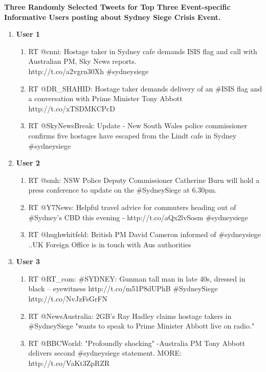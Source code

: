 \textbf{Three Randomly Selected Tweets for Top Three Event-specific Informative Users posting about Sydney Siege Crisis Event.}
\begin{enumerate}
\item \textbf{User 1}
\begin{enumerate}
\item RT @cnni: Hostage taker in Sydney cafe demands ISIS flag and call with Australian PM, Sky News reports. \\ http://t.co/a2vgrn30Xh \#sydneysiege
\item RT @DR\_SHAHID: Hostage taker demands delivery of an \#ISIS flag and a conversation with Prime Minister Tony Abbott http://t.co/xTSDMKCPcD
\item RT @SkyNewsBreak: Update - New South Wales police commissioner confirms five hostages have escaped from the Lindt cafe in Sydney \#sydneysiege
\end{enumerate}

\item \textbf{User 2}
\begin{enumerate}
\item RT @smh: NSW Police Deputy Commissioner Catherine Burn will hold a press conference to update on the \#SydneySiege at 6.30pm.
\item RT @Y7News: Helpful travel advice for commuters heading out of \#Sydney’s CBD this evening - http://t.co/aQx2lvSosm \#sydneysiege
\item RT @hughwhitfeld: British PM David Cameron informed of \#sydneysiege ..UK Foreign Office is in touch with Aus authorities
\end{enumerate}

\item \textbf{User 3}
\begin{enumerate}
\item RT @RT\_com: \#SYDNEY: Gunman tall man in late 40s, dressed in black – eyewitness http://t.co/m51P8dUPhB \#SydneySiege http://t.co/NvJzFsGrFN
\item RT @NewsAustralia: 2GB's Ray Hadley claims hostage takers in \#SydneySiege "wants to speak to Prime Minister Abbott live on radio."
\item RT @BBCWorld: "Profoundly shocking" -Australia PM Tony Abbott delivers second \#sydneysiege statement. MORE: http://t.co/VaKt3ZpRZR
\end{enumerate}

\end{enumerate}

